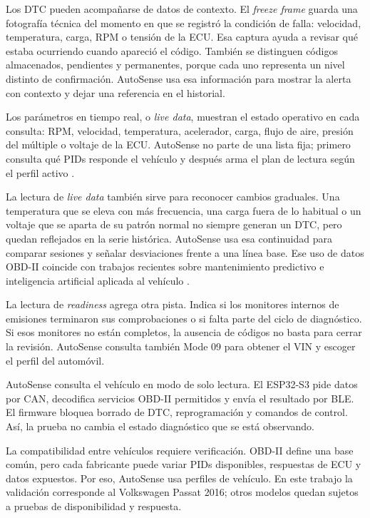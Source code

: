 \documentclass[12pt,letterpaper]{report}
\begin{document}
Los DTC pueden acompañarse de datos de contexto. El \textit{freeze frame} guarda una fotografía técnica del momento en que se registró la condición de falla: velocidad, temperatura, carga, RPM o tensión de la ECU. Esa captura ayuda a revisar qué estaba ocurriendo cuando apareció el código. También se distinguen códigos almacenados, pendientes y permanentes, porque cada uno representa un nivel distinto de confirmación. AutoSense usa esa información para mostrar la alerta con contexto y dejar una referencia en el historial.

Los parámetros en tiempo real, o \textit{live data}, muestran el estado operativo en cada consulta: RPM, velocidad, temperatura, acelerador, carga, flujo de aire, presión del múltiple o voltaje de la ECU. AutoSense no parte de una lista fija; primero consulta qué PIDs responde el vehículo y después arma el plan de lectura según el perfil activo \cite{yen2021_universal_obdii}.

La lectura de \textit{live data} también sirve para reconocer cambios graduales. Una temperatura que se eleva con más frecuencia, una carga fuera de lo habitual o un voltaje que se aparta de su patrón normal no siempre generan un DTC, pero quedan reflejados en la serie histórica. AutoSense usa esa continuidad para comparar sesiones y señalar desviaciones frente a una línea base. Ese uso de datos OBD-II coincide con trabajos recientes sobre mantenimiento predictivo e inteligencia artificial aplicada al vehículo \cite{michailidis2025_obdii_review,mahale2025_review_predictive_maintenance,tormos2025_explainable_ai}.

La lectura de \textit{readiness} agrega otra pista. Indica si los monitores internos de emisiones terminaron sus comprobaciones o si falta parte del ciclo de diagnóstico. Si esos monitores no están completos, la ausencia de códigos no basta para cerrar la revisión. AutoSense consulta también Mode 09 para obtener el VIN y escoger el perfil del automóvil.

AutoSense consulta el vehículo en modo de solo lectura. El ESP32-S3 pide datos por CAN, decodifica servicios OBD-II permitidos y envía el resultado por BLE. El firmware bloquea borrado de DTC, reprogramación y comandos de control. Así, la prueba no cambia el estado diagnóstico que se está observando.

La compatibilidad entre vehículos requiere verificación. OBD-II define una base común, pero cada fabricante puede variar PIDs disponibles, respuestas de ECU y datos expuestos. Por eso, AutoSense usa perfiles de vehículo. En este trabajo la validación corresponde al Volkswagen Passat 2016; otros modelos quedan sujetos a pruebas de disponibilidad y respuesta.
\end{document}
